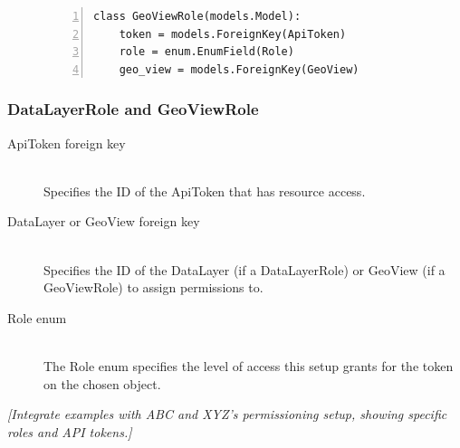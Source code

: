 \begin{figure}
\begin{Verbatim}[samepage=true,baselinestretch=1,numbers=left,xleftmargin=12mm]
class GeoViewRole(models.Model):
    token = models.ForeignKey(ApiToken)
    role = enum.EnumField(Role)
    geo_view = models.ForeignKey(GeoView)
\end{Verbatim}
\label{fig:geoviewrole}
\end{figure}

\subsubsection{DataLayerRole and GeoViewRole}
\begin{description}
\item[ApiToken foreign key] \hfill \\
Specifies the ID of the ApiToken that has resource access.

\item[DataLayer or GeoView foreign key] \hfill \\
Specifies the ID of the DataLayer (if a DataLayerRole) or GeoView (if a GeoViewRole) to assign permissions to.

\item[Role enum] \hfill \\
The Role enum specifies the level of access this setup grants for the token on the chosen object.
\end{description}


\textit{[Integrate examples with ABC and XYZ's permissioning setup, showing specific roles and API tokens.]}


\label{design_srid}
